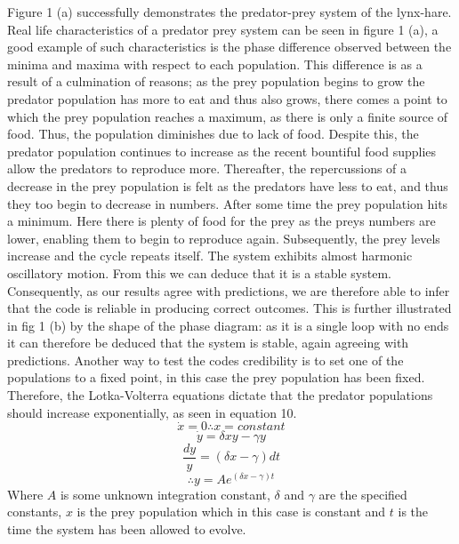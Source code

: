\documentclass[11pt]{elsarticle}
\begin{document}
Figure 1 (a) successfully demonstrates the predator-prey system of the lynx-hare. Real life characteristics of a predator prey system can be seen in figure 1 (a), a good example of such characteristics is the phase difference observed between the minima and maxima with respect to each population. This difference is as a result of a culmination of reasons; as the prey population begins to grow the predator population has more to eat and thus also grows, there comes a point to which the prey population reaches a maximum, as there is only a finite source of food. Thus, the population diminishes due to lack of food. Despite this, the predator population continues to increase as the recent bountiful food supplies allow the predators to reproduce more. Thereafter, the repercussions of a decrease in the prey population is felt as the predators have less to eat, and thus they too begin to decrease in numbers. After some time the prey population hits a minimum. Here there is plenty of food for the prey as the preys numbers are lower, enabling them to begin to reproduce again. Subsequently, the prey levels increase and the cycle repeats itself. The system exhibits almost harmonic oscillatory motion. From this we can deduce that it is a stable system. Consequently, as our results agree with predictions, we are therefore able to infer that the code is reliable in producing correct outcomes. This is further illustrated in fig 1 (b) by the shape of the phase diagram: as it is a single loop with no ends it can therefore be deduced that the system is stable, again agreeing with predictions. Another way to test the codes credibility is to set one of the populations to a fixed point, in this case the prey population has been fixed. Therefore, the Lotka-Volterra equations dictate that the predator populations should increase exponentially, as seen in equation 10.
\begin{equation*}
\dot{x}=0\therefore x = constant
\end{equation*}
\begin{equation*}
\dot{y}=\delta xy -\gamma y
\end{equation*}
\begin{equation*}
\frac{dy}{y}=\left(\delta x-\gamma\right)dt
\end{equation*}
\begin{equation}
\therefore y=Ae^{\left(\delta x -\gamma\right)t}
\end{equation}
Where $A$ is some unknown integration constant, $\delta$ and $\gamma$ are the specified constants, $x$ is the prey population which in this case is constant and $t$ is the time the system has been allowed to evolve.
\end{document}
